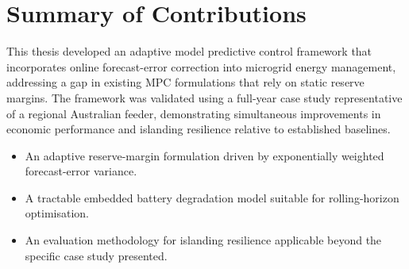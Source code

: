 \section{Summary of Contributions}

This thesis developed an adaptive model predictive control framework that incorporates online forecast-error correction into microgrid energy management, addressing a gap in existing MPC formulations that rely on static reserve margins. The framework was validated using a full-year case study representative of a regional Australian feeder, demonstrating simultaneous improvements in economic performance and islanding resilience relative to established baselines.

\begin{tcolorbox}[infobox={Key Contributions}]
\begin{itemize}[leftmargin=1.6em]
  \item An adaptive reserve-margin formulation driven by exponentially weighted forecast-error variance.
  \item A tractable embedded battery degradation model suitable for rolling-horizon optimisation.
  \item An evaluation methodology for islanding resilience applicable beyond the specific case study presented.
\end{itemize}
\end{tcolorbox}
